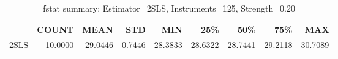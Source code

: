 \begin{table}[ht]
\centering
\caption{fstat summary: Estimator=2SLS, Instruments=125, Strength=0.20}
\begin{tabular}{lrrrrrrrr}
\toprule
 & COUNT & MEAN & STD & MIN & 25\% & 50\% & 75\% & MAX \\
\midrule
2SLS & 10.0000 & 29.0446 & 0.7446 & 28.3833 & 28.6322 & 28.7441 & 29.2118 & 30.7089 \\
\bottomrule
\end{tabular}
\end{table}
